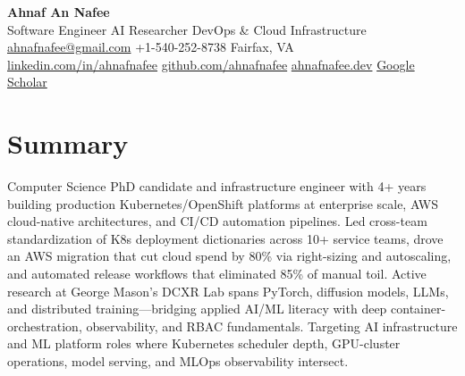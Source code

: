 \documentclass[letterpaper,10pt]{article}
\begin{document}
\begin{center}
  {\LARGE\bfseries\color{accent} Ahnaf An Nafee }\\[3pt]
  {\normalsize Software Engineer \textbar{} AI Researcher \textbar{} DevOps \& Cloud Infrastructure }\\[4pt]
  \small
  \href{mailto:ahnafnafee@gmail.com}{ahnafnafee@gmail.com} \textbar{}
  +1-540-252-8738 \textbar{}
  Fairfax, VA\\
  \href{https://linkedin.com/in/ahnafnafee}{linkedin.com/in/ahnafnafee} \textbar{}
  \href{https://github.com/ahnafnafee}{github.com/ahnafnafee} \textbar{}
  \href{https://www.ahnafnafee.dev}{ahnafnafee.dev} \textbar{} \href{https://scholar.google.com/citations?user=u15DO0cAAAAJ}{Google Scholar}
\end{center}

\section*{Summary}
Computer Science PhD candidate and infrastructure engineer with 4+ years building production Kubernetes/OpenShift platforms at enterprise scale, AWS cloud-native architectures, and CI/CD automation pipelines. Led cross-team standardization of K8s deployment dictionaries across 10+ service teams, drove an AWS migration that cut cloud spend by 80\% via right-sizing and autoscaling, and automated release workflows that eliminated 85\% of manual toil. Active research at George Mason's DCXR Lab spans PyTorch, diffusion models, LLMs, and distributed training---bridging applied AI/ML literacy with deep container-orchestration, observability, and RBAC fundamentals. Targeting AI infrastructure and ML platform roles where Kubernetes scheduler depth, GPU-cluster operations, model serving, and MLOps observability intersect.

\end{document}
